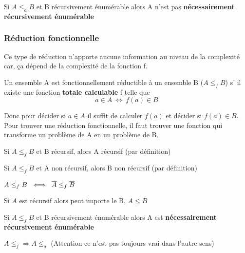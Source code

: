 \begin{myprop}
	Si $A \leq_a B$ et B récursivement énumérable alors A n'est pas 
	\textbf{nécessairement récursivement énumérable}
\end{myprop}

\subsubsection{Réduction fonctionnelle}
Ce type de réduction n'apporte aucune information au niveau de la complexité
car, ça dépend de la complexité de la fonction f.

\begin{mydef}
	Un ensemble A est fonctionnellement réductible à un ensemble B 
	($A\leq_f B$) s’ il existe une fonction \textbf{totale calculable} f 
	telle que 
	\[ a\in A \ \iff \ f(a) \in B \]
\end{mydef}

\begin{myrem}
	Donc pour décider si $a\in A$ il suffit de calculer $f(a)$ et décider si 
	$f(a) \in B$. Pour trouver une réduction fonctionnelle, il faut trouver 
	une fonction qui transforme un problème de A en un problème de B.
\end{myrem}

\begin{myprop}
	Si $A \leq_f B$ et B récursif, alors A récursif (par définition)
\end{myprop}

\begin{myprop}
	Si $A \leq_f B$ et A non récursif, alors B non récursif (par définition)
\end{myprop}

\begin{myprop}
	$A \leq_f B \ \iff \ \overline{A} \leq_f \overline{B}$
\end{myprop}

\begin{myprop}
	Si $A$ est récursif alors peut importe le B, $A \leq B$
\end{myprop}

\begin{myprop}
	Si $A \leq_f B$ et B récursivement énumérable alors A est
	\textbf{nécessairement récursivement énumérable}
\end{myprop}

\begin{myprop}
	$A\leq_f \Rightarrow A\leq_a$ (Attention ce n'est pas toujours vrai 
	dans l'autre sens)
\end{myprop}

